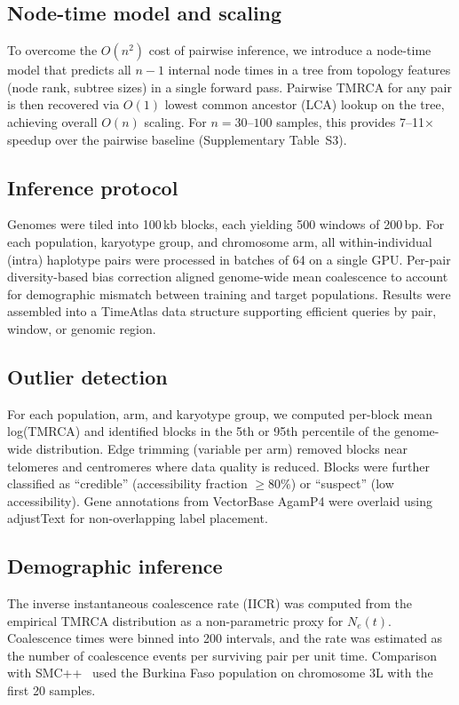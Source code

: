 \documentclass[10pt]{article}
\begin{document}
\subsection*{Node-time model and scaling}

To overcome the $O(n^2)$ cost of pairwise inference, we introduce a node-time
model that predicts all $n-1$ internal node times in a tree from topology
features (node rank, subtree sizes) in a single forward pass. Pairwise TMRCA
for any pair is then recovered via $O(1)$ lowest common ancestor (LCA) lookup
on the tree, achieving overall $O(n)$ scaling. For $n = 30$--$100$ samples,
this provides 7--11$\times$ speedup over the pairwise baseline
(Supplementary Table~S3).

\subsection*{Inference protocol}

Genomes were tiled into 100\,kb blocks, each yielding 500 windows of
200\,bp. For each population, karyotype group, and chromosome arm, all
within-individual (intra) haplotype pairs were processed in batches of 64
on a single GPU. Per-pair diversity-based bias correction aligned genome-wide
mean coalescence to account for demographic mismatch between training and
target populations. Results were assembled into a TimeAtlas data structure
supporting efficient queries by pair, window, or genomic region.

\subsection*{Outlier detection}

For each population, arm, and karyotype group, we computed per-block mean
log(TMRCA) and identified blocks in the 5th or 95th percentile of the
genome-wide distribution. Edge trimming (variable per arm) removed blocks
near telomeres and centromeres where data quality is reduced. Blocks were
further classified as ``credible'' (accessibility fraction $\geq 80\%$) or
``suspect'' (low accessibility). Gene annotations from VectorBase AgamP4
were overlaid using adjustText for non-overlapping label placement.

\subsection*{Demographic inference}

The inverse instantaneous coalescence rate (IICR) was computed from the
empirical TMRCA distribution as a non-parametric proxy for $N_e(t)$.
Coalescence times were binned into 200 intervals, and the rate was estimated
as the number of coalescence events per surviving pair per unit time.
Comparison with SMC++~\citep{terhorst2017robust} used the Burkina Faso
population on chromosome 3L with the first 20 samples.
\end{document}
